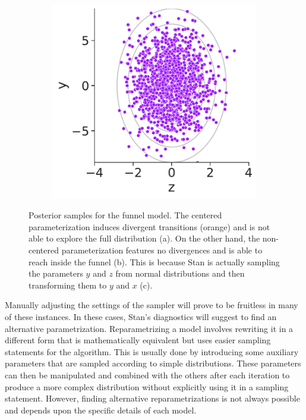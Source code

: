 \begin{figure}[t]
\begin{subfigure}[b]{0.31\linewidth}
\caption{}
\end{subfigure}
\hfill
\begin{subfigure}[b]{0.31\linewidth}
\includegraphics[width=\linewidth]{figures/ch2/poisson/funnel_2.pdf}
\caption{}
\end{subfigure}
\caption{Posterior samples for the funnel model. The centered parameterization induces divergent transitions (orange) and is
not able to explore the full distribution (a). On the other hand, the non-centered parameterization features no
divergences and is able to reach inside the funnel (b). This is because Stan is actually sampling the parameters $y$ and $z$
from normal distributions and then transforming them to $y$ and $x$ (c).}
\label{funnel}
\end{figure}
Manually adjusting the settings of the sampler will prove to be fruitless in many of these instances. In these cases, Stan's diagnostics will suggest to find an alternative parametrization.
Reparametrizing a model involves rewriting it in a different form that is mathematically equivalent but uses easier sampling statements for the algorithm. This is usually done by introducing some auxiliary parameters that are sampled according to simple distributions. These parameters can then be manipulated and combined with the others after each iteration to produce a more complex distribution without explicitly using it in a sampling statement. However, finding alternative reparametrizations is not always possible and depends upon the specific details of each model. 

